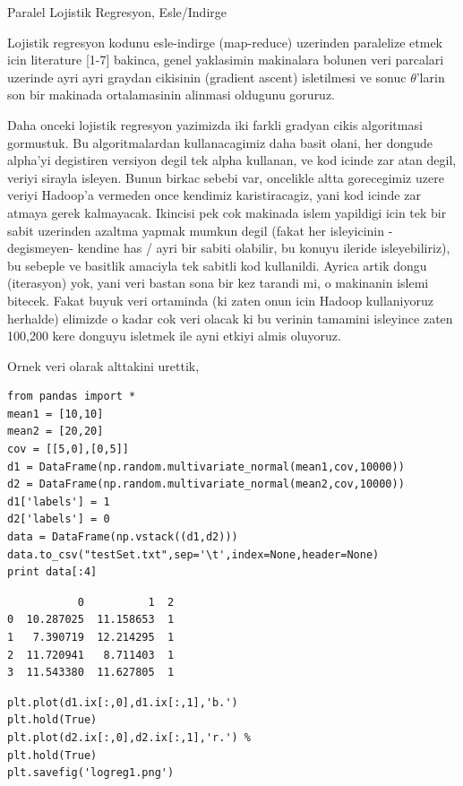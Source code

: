 \documentclass[12pt,fleqn]{article}\usepackage{../common}
\begin{document}
Paralel Lojistik Regresyon, Esle/Indirge

Lojistik regresyon kodunu esle-indirge (map-reduce) uzerinden paralelize
etmek icin literature [1-7] bakinca, genel yaklasimin makinalara bolunen
veri parcalari uzerinde ayri ayri graydan cikisinin (gradient ascent)
isletilmesi ve sonuc $\theta$'larin son bir makinada ortalamasinin alinmasi
oldugunu goruruz.

Daha onceki lojistik regresyon yazimizda iki farkli gradyan cikis
algoritmasi gormustuk. Bu algoritmalardan kullanacagimiz daha basit olani,
her dongude alpha'yi degistiren versiyon degil tek alpha kullanan, ve kod
icinde zar atan degil, veriyi sirayla isleyen. Bunun birkac sebebi var,
oncelikle altta gorecegimiz uzere veriyi Hadoop'a vermeden once kendimiz
karistiracagiz, yani kod icinde zar atmaya gerek kalmayacak. Ikincisi pek
cok makinada islem yapildigi icin tek bir sabit uzerinden azaltma yapmak
mumkun degil (fakat her isleyicinin -degismeyen- kendine has / ayri bir
sabiti olabilir, bu konuyu ileride isleyebiliriz), bu sebeple ve basitlik
amaciyla tek sabitli kod kullanildi. Ayrica artik dongu (iterasyon) yok,
yani veri bastan sona bir kez tarandi mi, o makinanin islemi bitecek. Fakat
buyuk veri ortaminda (ki zaten onun icin Hadoop kullaniyoruz herhalde)
elimizde o kadar cok veri olacak ki bu verinin tamamini isleyince zaten
100,200 kere donguyu isletmek ile ayni etkiyi almis oluyoruz.

Ornek veri olarak alttakini urettik,

\begin{verbatim}
from pandas import *
mean1 = [10,10]
mean2 = [20,20]
cov = [[5,0],[0,5]]             
d1 = DataFrame(np.random.multivariate_normal(mean1,cov,10000))
d2 = DataFrame(np.random.multivariate_normal(mean2,cov,10000))
d1['labels'] = 1
d2['labels'] = 0
data = DataFrame(np.vstack((d1,d2)))
data.to_csv("testSet.txt",sep='\t',index=None,header=None)
print data[:4]
\end{verbatim}

\begin{verbatim}
           0          1  2
0  10.287025  11.158653  1
1   7.390719  12.214295  1
2  11.720941   8.711403  1
3  11.543380  11.627805  1
\end{verbatim}

\begin{verbatim}
plt.plot(d1.ix[:,0],d1.ix[:,1],'b.')
plt.hold(True)
plt.plot(d2.ix[:,0],d2.ix[:,1],'r.') %
plt.hold(True)
plt.savefig('logreg1.png')
\end{verbatim}
\end{document}

